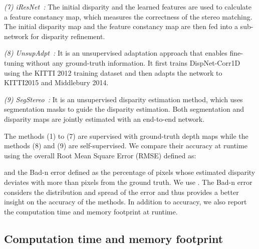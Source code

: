 \documentclass[10pt,journal,compsoc]{IEEEtran}
\newcommand{\noi}{\noindent}
\begin{document}
\vspace{6pt}
\noi\textit{(7) iResNet~\cite{liang2018learning}: }  The initial disparity and the  learned features are used to calculate a feature constancy map, which measures the correctness of the stereo matching. The initial disparity map and the feature constancy map are then fed into a sub-network for disparity refinement.
	
\vspace{6pt}
\noi\textit{(8) UnsupAdpt~\cite{tonioni2017unsupervised}:} It is an unsupervised adaptation approach that enables fine-tuning  without any ground-truth information. It first trains DispNet-Corr1D~\cite{mayer2016large} using  the KITTI 2012 training dataset and then adapts the network to KITTI2015 and Middlebury 2014. 


\vspace{6pt}
\noi\textit{(9) SegStereo~\cite{yang2018segstereo}:} It is an unsupervised disparity estimation method, which uses segmentation masks to guide the disparity estimation. Both segmentation and disparity  maps are jointly estimated with an end-to-end network.

 
 The methods (1) to (7)  are supervised with ground-truth depth maps while the methods (8) and (9) are self-supervised. We compare their accuracy at runtime using  the  overall Root Mean Square Error  (RMSE) defined as:
		 	
\noi and the Bad-n error defined as the percentage of pixels whose estimated disparity deviates with more than   pixels from the ground truth. We use . The Bad-n error  considers the distribution and spread of the error and thus provides a better insight on the accuracy of the methods. In addition to accuracy, we also report the computation time  and memory footprint at runtime. 





\subsection{Computation time and memory footprint}
\label{sec:performance_stereo_time}
\end{document}

